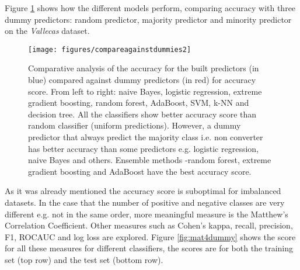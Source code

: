 \documentclass[11pt]{article}
\theoremstyle{definition}
\theoremstyle{remark}
\begin{document}
Figure \ref{fig:dummies} shows how the different models perform, comparing accuracy with three dummy predictors: random predictor, majority predictor and minority predictor on the \emph{Vallecas} dataset. 
\begin{figure}[H] 
        \centering
        \texttt{[image: figures/compareagainstdummies2]}
        \caption{Comparative analysis of the accuracy for the built predictors (in blue) compared against dummy predictors (in red) for accuracy score. From left to right: naive Bayes, logistic regression, extreme gradient boosting, random forest, AdaBoost, SVM, k-NN and decision tree. All the classifiers show better accuracy score than random classifier (uniform predictions). However, a dummy predictor that always predict the majority class i.e. non converter has better accuracy than some predictors e.g. logistic regression, naive Bayes and others. Ensemble methods -random forest, extreme gradient boosting and AdaBoost have the best accuracy score.
        } \label{fig:dummies}
\end{figure}

As it was already mentioned the accuracy score is suboptimal for imbalanced datasets. In the case that the number of positive and negative classes are very different e.g. not in the same order, more meaningful measure is the Matthew’s Correlation Coefficient. Other measures such as Cohen's kappa, recall, precision, F1, ROCAUC and log loss are explored. 
Figure \ref{fig:mat4dummy} shows the score for all these measures for different classifiers, the scores are for both the training set (top row) and the test set (bottom row). 
\end{document}
